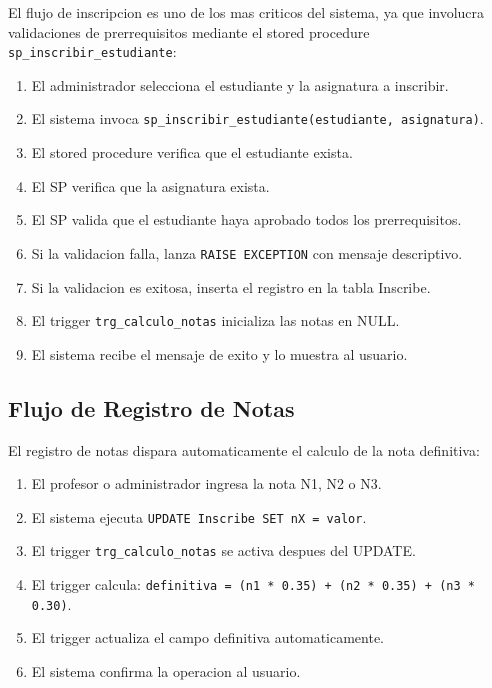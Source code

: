\documentclass[12pt,a4paper]{article}
\begin{document}
El flujo de inscripcion es uno de los mas criticos del sistema, ya que involucra validaciones de prerrequisitos mediante el stored procedure \texttt{sp\_inscribir\_estudiante}:

\begin{enumerate}
    \item El administrador selecciona el estudiante y la asignatura a inscribir.
    \item El sistema invoca \texttt{sp\_inscribir\_estudiante(estudiante, asignatura)}.
    \item El stored procedure verifica que el estudiante exista.
    \item El SP verifica que la asignatura exista.
    \item El SP valida que el estudiante haya aprobado todos los prerrequisitos.
    \item Si la validacion falla, lanza \texttt{RAISE EXCEPTION} con mensaje descriptivo.
    \item Si la validacion es exitosa, inserta el registro en la tabla Inscribe.
    \item El trigger \texttt{trg\_calculo\_notas} inicializa las notas en NULL.
    \item El sistema recibe el mensaje de exito y lo muestra al usuario.
\end{enumerate}

\subsection{Flujo de Registro de Notas}

El registro de notas dispara automaticamente el calculo de la nota definitiva:

\begin{enumerate}
    \item El profesor o administrador ingresa la nota N1, N2 o N3.
    \item El sistema ejecuta \texttt{UPDATE Inscribe SET nX = valor}.
    \item El trigger \texttt{trg\_calculo\_notas} se activa despues del UPDATE.
    \item El trigger calcula: \texttt{definitiva = (n1 * 0.35) + (n2 * 0.35) + (n3 * 0.30)}.
    \item El trigger actualiza el campo definitiva automaticamente.
    \item El sistema confirma la operacion al usuario.
\end{enumerate}
\end{document}
